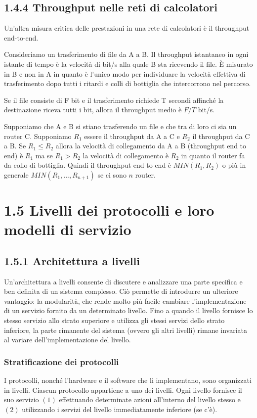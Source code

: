 \documentclass{book}
\begin{document}
\subsection*{1.4.4 Throughput nelle reti di calcolatori}
Un'altra misura critica delle prestazioni in una rete di calcolatori è il throughput end-to-end.

Consideriamo un trasferimento di file da A a B. Il throughput istantaneo in ogni istante di tempo è la velocità di bit/s alla quale B sta ricevendo il file. È misurato in B e non in A in quanto è l'unico modo per individuare la velocità effettiva di trasferimento dopo tutti i ritardi e colli di bottiglia che intercorrono nel percorso.

Se il file consiste di F bit e il trasferimento richiede T secondi affinché la destinazione riceva tutti i bit, allora il throughput medio è $F/T$ bit/s.

Supponiamo che A e B si stiano trasferendo un file e che tra di loro ci sia un router C. Supponiamo $R_{1}$ essere il throughput da A a C e $R_{2}$ il throughput da C a B. Se $R_{1} \leq R_{2}$ allora la velocità di collegamento da A a B (throughput end to end) è $R_{1}$ ma se $R_{1} > R_{2} $ la velocità di collegamento è $R_{2} $ in quanto il router fa da collo di bottiglia. Quindi il throughput end to end è $MIN(R_{1}, R_{2})$ o più in generale $MIN(R_{1}, ..., R_{n+1})$
se ci sono $n$ router.

\section*{1.5 Livelli dei protocolli e loro modelli di servizio} 
\subsection*{1.5.1 Architettura a livelli}
Un'architettura a livelli consente di discutere e analizzare una parte specifica e ben definita di un sistema complesso. Ciò permette di introdurre un ulteriore vantaggio: la modularità, che rende molto più facile cambiare l'implementazione di un servizio fornito da un determinato livello. Fino a quando il livello fornisce lo stesso servizio allo strato superiore e utilizza gli stessi servizi dello strato inferiore, la parte rimanente del sistema (ovvero gli altri livelli) rimane invariata al variare dell'implementazione del livello.

\subsubsection{Stratificazione dei protocolli}
I protocolli, nonché l'hardware e il software che li implementano, sono organizzati in livelli. Ciascun protocollo appartiene a uno dei livelli. Ogni livello fornisce il suo servizio $(1)$ effettuando determinate azioni all'interno del livello stesso e $(2)$ utilizzando i servizi del livello immediatamente inferiore (se c'è).
\end{document}
